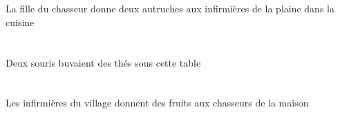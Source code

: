 \begin{exe}
    \DEFSgOblP{}   \cuisineDSgOblP{}   \DANSP{}   \DEFSgErgP{}    \DEFSgOblP{}   \chasseurCSgOblP{}   \DEP{}   \filleCSgErgP{}    \DEFPlOblP{}    \DEFSgOblP{}   \plaineASgOblP{}   \DEP{}   \infirmiereAPlOblP{}   \AP{}   \INDDuAbsP{}   \autrucheBDuAbsP{}  \donnerVdPrsBDuP{} \\
    \DEFSgOblG{}   \cuisineDSgOblG{}   \DANSG{}   \DEFSgErgG{}    \DEFSgOblG{}   \chasseurCSgOblG{}   \DEG{}   \filleCSgErgG{}    \DEFPlOblG{}    \DEFSgOblG{}   \plaineASgOblG{}   \DEG{}   \infirmiereAPlOblG{}   \AG{}   \INDDuAbsG{}   \autrucheBDuAbsG{}  \donnerVdPrsBDuG{} \\
 La fille du chasseur donne deux autruches aux infirmières de la plaine dans la cuisine
\ex\glll
    \DEMSgObl{}   \tableDSgObl{}   \SOUS{}   \INDDuErg{}   \sourisBDuErg{}   \INDPlAbs{}   \theBPlAbs{}  \boireVtPstBPl{} \\
    \DEMSgOblP{}   \tableDSgOblP{}   \SOUSP{}   \INDDuErgP{}   \sourisBDuErgP{}   \INDPlAbsP{}   \theBPlAbsP{}  \boireVtPstBPlP{} \\
    \DEMSgOblG{}   \tableDSgOblG{}   \SOUSG{}   \INDDuErgG{}   \sourisBDuErgG{}   \INDPlAbsG{}   \theBPlAbsG{}  \boireVtPstBPlG{} \\
 Deux souris buvaient des thés sous cette table
\ex\glll
    \DEFSgObl{}   \maisonDSgObl{}   \DE{}   \DEFPlErg{}    \DEFSgObl{}   \villageCSgObl{}   \DE{}   \infirmiereAPlErg{}    \DEFPlObl{}   \chasseurCPlObl{}   \A{}   \INDPlAbs{}   \fruitAPlAbs{}  \donnerVdPrsAPl{} \\
    \DEFSgOblP{}   \maisonDSgOblP{}   \DEP{}   \DEFPlErgP{}    \DEFSgOblP{}   \villageCSgOblP{}   \DEP{}   \infirmiereAPlErgP{}    \DEFPlOblP{}   \chasseurCPlOblP{}   \AP{}   \INDPlAbsP{}   \fruitAPlAbsP{}  \donnerVdPrsAPlP{} \\
    \DEFSgOblG{}   \maisonDSgOblG{}   \DEG{}   \DEFPlErgG{}    \DEFSgOblG{}   \villageCSgOblG{}   \DEG{}   \infirmiereAPlErgG{}    \DEFPlOblG{}   \chasseurCPlOblG{}   \AG{}   \INDPlAbsG{}   \fruitAPlAbsG{}  \donnerVdPrsAPlG{} \\
 Les infirmières du village donnent des fruits aux chasseurs de la maison
\ex\glll
   \DEFPlAbs{}    \DEFSgObl{}   \villageCSgObl{}   \DE{}   \sourisBPlAbs{}    \DEFSgObl{}   \chatDSgObl{}   \DEVANT{}  \dormirViPrsBPl{} \\
   \DEFPlAbsP{}    \DEFSgOblP{}   \villageCSgOblP{}   \DEP{}   \sourisBPlAbsP{}    \DEFSgOblP{}   \chatDSgOblP{}   \DEVANTP{}  \dormirViPrsBPlP{} \\
   \DEFPlAbsG{}    \DEFSgOblG{}   \villageCSgOblG{}   \DEG{}   \sourisBPlAbsG{}    \DEFSgOblG{}   \chatDSgOblG{}   \DEVANTG{}  \dormirViPrsBPlG{} \\

\end{exe}
